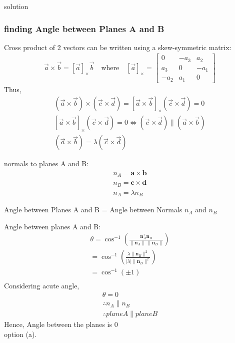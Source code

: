 \documentclass{beamer}
\begin{document}
\begin{frame}{solution}
    \frametitle{finding Angle between Planes A and B}
Cross product of 2 vectors can be written using a skew-symmetric matrix:
\begin{align}
\vec{a} \times \vec{b} = [\vec{a}]_{\times} \vec{b} \quad \text{where} \quad [\vec{a}]_{\times} = \begin{bmatrix}0 & -a_3 & a_2 \\a_3 & 0 & -a_1 \\-a_2 & a_1 & 0\end{bmatrix}
\end{align}
Thus,
\begin{align}
(\vec{a} \times \vec{b}) \times (\vec{c} \times \vec{d}) = [\vec{a} \times \vec{b}]_{\times}(\vec{c} \times \vec{d}) = 0\\
[\vec{a} \times \vec{b}]_{\times}(\vec{c} \times \vec{d}) = 0 \iff (\vec{c} \times \vec{d}) \parallel (\vec{a} \times \vec{b})\\
(\vec{a} \times \vec{b}) = \lambda(\vec{c} \times\vec{d})
\end{align}
\end{frame}
\begin{frame}
normals to planes A and B:
\begin{align}
n_A = \mathbf{a} \times \mathbf{b}\\
n_B = \mathbf{c} \times \mathbf{d}\\
n_A = \lambda n_B
\end{align}

Angle between Planes A and B = Angle between Normals $n_A$ and $n_B$
\end{frame}
\begin{frame}
Angle between planes A and B:
\begin{align}
\theta = \cos^{-1}\!\left(
\frac{\mathbf{n}_A^\top \mathbf{n}_B}{\|\mathbf{n}_A\|\,\|\mathbf{n}_B\|}
\right)\\
= \cos^{-1}\!\left(
\frac{\lambda\|\mathbf{n}_B\|^2}{|\lambda|\|\mathbf{n}_B\|^2}
\right)\\
= \cos^{-1}(\pm 1)\\
\end{align}
Considering acute angle,
\begin{align}
\theta=0\\
\therefore n_A \parallel n_B\\
\therefore plane A \parallel plane B
\end{align}
Hence, Angle between the planes is $0$\\option (a).

\end{frame}
\end{document}
